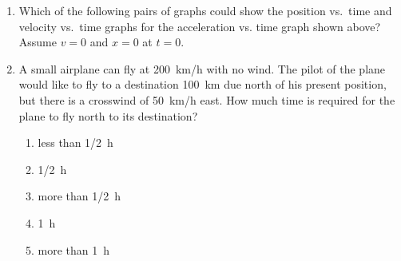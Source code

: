 \documentclass{../../../oss-apphys}
\begin{document}
\begin{multicols}{2}
\begin{enumerate}[resume,leftmargin=18pt]
  \item Which of the following pairs of graphs could show the position vs.\
    time and velocity vs.\ time graphs for the acceleration vs. time graph
    shown above? Assume $v=0$ and $x=0$ at $t=0$.
    \begin{center}
    \end{center}
    \columnbreak
    
  \item A small airplane can fly at \SI{200}{km/h} with no wind. The pilot of
    the plane would like to fly to a destination \SI{100}{km} due north of his
    present position, but there is a crosswind of \SI{50}{km/h} east. How much
    time is required for the plane to fly north to its destination?
    \begin{enumerate}[noitemsep,topsep=0pt,leftmargin=18pt,label=(\Alph*)]
    \item less than \SI{1/2}{\hour}
    \item \SI{1/2}{\hour}
    \item more than \SI{1/2}{\hour}
    \item \SI{1}{\hour}
    \item more than \SI{1}{\hour}
    \end{enumerate}
    

\end{enumerate}
\end{multicols}
\end{document}
